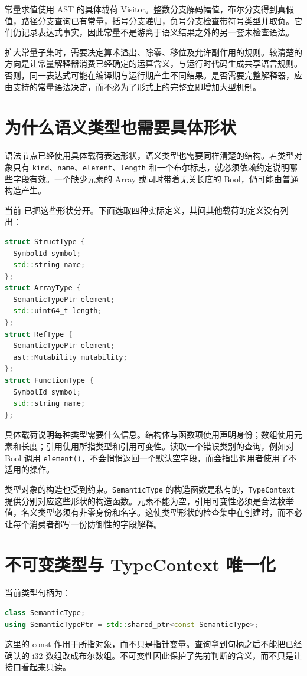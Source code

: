 常量求值使用 AST 的具体载荷 Visitor。整数分支解码幅值，布尔分支得到真假值，路径分支查询已有常量，括号分支递归，负号分支检查带符号类型并取负。它们仍记录表达式事实，因此常量不是游离于语义结果之外的另一套未检查语法。

扩大常量子集时，需要决定算术溢出、除零、移位及允许副作用的规则。较清楚的方向是让常量解释器消费已经确定的运算含义，与运行时代码生成共享语言规则。否则，同一表达式可能在编译期与运行期产生不同结果。是否需要完整解释器，应由支持的常量语法决定，而不必为了形式上的完整立即增加大型机制。

\section{为什么语义类型也需要具体形状}
语法节点已经使用具体载荷表达形状，语义类型也需要同样清楚的结构。若类型对象只有 \texttt{kind}、\texttt{name}、\texttt{element}、\texttt{length} 和一个布尔标志，就必须依赖约定说明哪些字段有效。一个缺少元素的 Array 或同时带着无关长度的 Bool，仍可能由普通构造产生。

当前  已把这些形状分开。下面选取四种实际定义，其间其他载荷的定义没有列出：
\begin{lstlisting}[language=C++]
struct StructType {
  SymbolId symbol;
  std::string name;
};
struct ArrayType {
  SemanticTypePtr element;
  std::uint64_t length;
};
struct RefType {
  SemanticTypePtr element;
  ast::Mutability mutability;
};
struct FunctionType {
  SymbolId symbol;
  std::string name;
};
\end{lstlisting}
具体载荷说明每种类型需要什么信息。结构体与函数项使用声明身份；数组使用元素和长度；引用使用所指类型和引用可变性。读取一个错误类别的查询，例如对 Bool 调用 \texttt{element()}，不会悄悄返回一个默认空字段，而会指出调用者使用了不适用的操作。

类型对象的构造也受到约束。\texttt{SemanticType} 的构造函数是私有的，\texttt{TypeContext} 提供分别对应这些形状的构造函数。元素不能为空，引用可变性必须是合法枚举值，名义类型必须有非零身份和名字。这使类型形状的检查集中在创建时，而不必让每个消费者都写一份防御性的字段解释。

\section{不可变类型与 TypeContext 唯一化}
当前类型句柄为：
\begin{lstlisting}[language=C++]
class SemanticType;
using SemanticTypePtr = std::shared_ptr<const SemanticType>;
\end{lstlisting}
这里的 const 作用于所指对象，而不只是指针变量。查询拿到句柄之后不能把已经确认的 i32 数组改成布尔数组。不可变性因此保护了先前判断的含义，而不只是让接口看起来只读。

